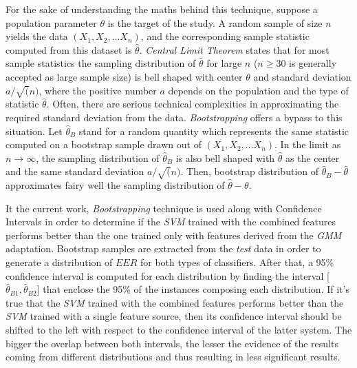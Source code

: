 For the sake of understanding the maths behind this technique,
suppose a population parameter $\theta$ is the target of the study. A random sample
of size $n$ yields the data $(X_{1}, X_{2}, \dotsc X_{n})$, and the corresponding
sample statistic computed from this dataset is ${\hat{\theta}}$.
\textit{Central Limit Theorem} states that for most sample
statistics the sampling distribution of ${\hat{\theta}}$ for large $n$
($n \geq 30$ is generally accepted as large sample size) is bell shaped with
center $\theta$ and standard deviation $a / \sqrt(n)$, where the positive number $a$
depends on the population and the type of statistic ${\hat{\theta}}$.
Often, there are serious technical complexities in approximating the required
standard deviation from the data. \textit{Bootstrapping} offers a bypass to this situation.
Let ${\hat{\theta}}_{B}$ stand for a random quantity which represents the same statistic
computed on a bootstrap sample drawn out of $(X_{1}, X_{2}, \dotsc X_{n})$.
In the limit as $n \to \infty$, the sampling distribution of ${\hat{\theta}}_{B}$
is also bell shaped with ${\hat{\theta}}$ as the center and the same standard deviation
$a / \sqrt(n)$. Then, bootstrap distribution of $\hat{\theta}_{B} - \hat{\theta}$
approximates fairy well the sampling distribution of $\hat{\theta} - \theta$.

It the current work, \textit{Bootstrapping} technique is used along with Confidence
Intervals in order to determine if the \textit{SVM} trained with the combined features
performs better than the one trained only with features derived from the \textit{GMM} adaptation.
Bootstrap samples are extracted from the \textit{test} data in order
to generate a distribution of $EER$ for both types of classifiers. After that,
a 95\% confidence interval is computed for each distribution by finding the interval
[$\hat{\theta}_{B1}, \hat{\theta}_{B2}$] that enclose the 95\% of the instances
composing each distribution.
If it's true that the \textit{SVM} trained with
the combined features performs better than the
\textit{SVM} trained with a single feature source, then its confidence
interval should be shifted to the left with respect to the confidence interval
of the latter system.
The bigger the overlap between both intervals, the
lesser the evidence of the results coming from different distributions and thus
resulting in less significant results.
